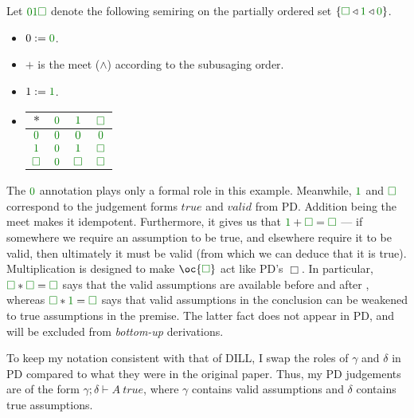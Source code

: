 \begin{definition}
  Let $\instPD$ denote the following semiring on the partially ordered set
  $\{\valid \triangleleft \true \triangleleft \unused\}$.
  \begin{itemize}
    \item $0 := \unused$.
    \item $+$ is the meet ($\wedge$) according to the subusaging order.
    \item $1 := \true$.
    \item
      \begin{tabular}{c|ccc}
        $*$ & $\unused$ & $\true$ & $\valid$ \\ \hline
        $\unused$ & $\unused$ & $\unused$ & $\unused$ \\
        $\true$ & $\unused$ & $\true$ & $\valid$ \\
        $\valid$ & $\unused$ & $\valid$ & $\valid$ \\
      \end{tabular}
  \end{itemize}
\end{definition}

The $\unused$ annotation plays only a formal role in this example.
Meanwhile, $\true$ and $\valid$ correspond to the judgement forms
$\mathit{true}$ and $\mathit{valid}$ from PD\@.
Addition being the meet makes it idempotent.
Furthermore, it gives us that $\true + \valid = \valid$ --- if somewhere we
require an assumption to be true, and elsewhere require it to be valid, then
ultimately it must be valid (from which we can deduce that it is true).
Multiplication is designed to make $\oc{\valid}$ act like PD's $\Box$.
In particular, $\valid * \valid = \valid$ says that the valid assumptions are
available before and after , whereas
$\valid * \true = \valid$ says that valid assumptions in the conclusion can be
weakened to true assumptions in the premise.
The latter fact does not appear in PD, and will be excluded from
\emph{bottom-up} derivations.

To keep my notation consistent with that of DILL, I swap the roles of
$\gamma$ and $\delta$ in PD compared to what they were in the original paper.
Thus, my PD judgements are of the form $\gamma; \delta \vdash A~\mathit{true}$,
where $\gamma$ contains valid assumptions and $\delta$ contains true
assumptions.

